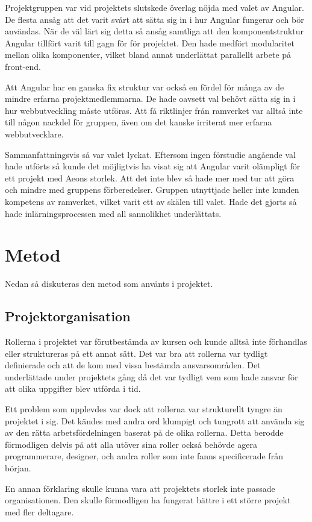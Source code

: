 Projektgruppen var vid projektets slutskede överlag nöjda med valet av Angular. De flesta ansåg att det varit svårt att sätta sig in i hur Angular fungerar och bör användas. När de väl lärt sig detta så ansåg samtliga att den komponentstruktur Angular tillfört varit till gagn för för projektet. Den hade medfört modularitet mellan olika komponenter, vilket bland annat underlättat parallellt arbete på front-end.

Att Angular har en ganska fix struktur var också en fördel för många av de mindre erfarna projektmedlemmarna. De hade oavsett val behövt sätta sig in i hur webbutveckling måste utföras. Att få riktlinjer från ramverket var alltså inte till någon nackdel för gruppen, även om det kanske irriterat mer erfarna webbutvecklare.

Sammanfattningsvis så var valet lyckat. Eftersom ingen förstudie angående val hade utförts så kunde det möjligtvis ha visat sig att Angular varit olämpligt för ett projekt med Aeons storlek. Att det inte blev så hade mer med tur att göra och mindre med gruppens förberedelser. Gruppen utnyttjade heller inte kunden kompetens av ramverket, vilket varit ett av skälen till valet. Hade det gjorts så hade inlärningsprocessen med all sannolikhet underlättats.

\section{Metod}
Nedan så diskuteras den metod som använts i projektet.

\subsection{Projektorganisation}
Rollerna i projektet var förutbestämda av kursen och kunde alltså inte förhandlas eller struktureras på ett annat sätt. Det var bra att rollerna var tydligt definierade och att de kom med vissa bestämda ansvarsområden. Det underlättade under projektets gång då det var tydligt vem som hade ansvar för att olika uppgifter blev utförda i tid.

Ett problem som upplevdes var dock att rollerna var strukturellt tyngre än projektet i sig. Det kändes med andra ord klumpigt och tungrott att använda sig av den rätta arbetsfördelningen baserat på de olika rollerna. Detta berodde förmodligen delvis på att alla utöver sina roller också behövde agera programmerare, designer, och andra roller som inte fanns specificerade från början.

En annan förklaring skulle kunna vara att projektets storlek inte passade organisationen. Den skulle förmodligen ha fungerat bättre i ett större projekt med fler deltagare.

